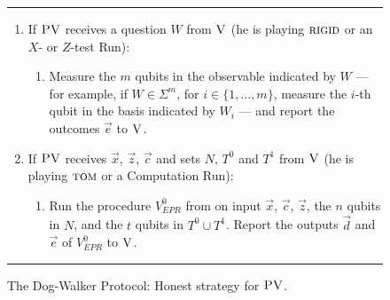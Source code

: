 \documentclass{toc}
\newcommand{\rigid}{\textsc{rigid}}
\newcommand{\tom}{\textsc{tom}}
\newcommand{\ver}{\textsc{V}}
\newcommand{\pv}{\textsc{PV}}
\begin{document}
\begin{figure}[H]
\rule[1ex]{\textwidth}{0.5pt}
\vspace{-20pt}
\begin{enumerate}
  \item If $\pv$ receives a question ${W}$ from $\ver$ (he is playing $\rigid$ or an $X$- or $Z$-test Run):
\begin{enumerate}
     \item[]  Measure the $m$ qubits in the observable indicated by $W$ --- for example, if $W\in \Sigma^m$, for $i\in \{1,\ldots,m\}$, measure the $i$-th qubit in the basis indicated by $W_i$ --- and report the outcomes $\vec{e}$ to $\ver$.
\end{enumerate}

  \item If $\pv$ receives $\vec{x}$, $\vec{z}$, $\vec{c}$ and sets $N$, $T^0$ and $T^1$ from $\ver$ (he is playing $\tom$ or a Computation Run):
\begin{enumerate}
	\item[] Run the procedure $V_{EPR}^0$ from  on input $\vec{x}$, $\vec{c}$, $\vec{z}$, the $n$ qubits in $N$, and the $t$ qubits in $T^0\cup T^1$. Report the outputs  $\vec{d}$ and $\vec{e}$ of $V_{EPR}^0$ to $\ver$.
\end{enumerate}
\end{enumerate}
\rule[2ex]{\textwidth}{0.5pt}\vspace{-.5cm}
\caption{The Dog-Walker Protocol: Honest strategy for $\pv$.}\label{fig:dogwalker-protocol-PV}
\end{figure}
\end{document}
